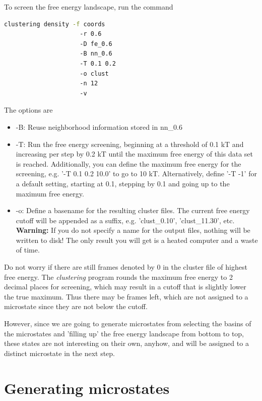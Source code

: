 \documentclass[12pt,a4paper,twoside,english,fleqn]{article}
\begin{document}
To screen the free energy landscape, run the command
\begin{lstlisting}[language=bash,basicstyle=\ttfamily]
  clustering density -f coords
                     -r 0.6
                     -D fe_0.6
                     -B nn_0.6
                     -T 0.1 0.2
                     -o clust
                     -n 12
                     -v
\end{lstlisting}
The options are
\begin{itemize}
  \item -B: Reuse neighborhood information stored in nn\_0.6
  \item -T: Run the free energy screening, beginning at a threshold of 0.1 kT
            and increasing per step by 0.2 kT until the maximum free energy
            of this data set is reached.
            Additionally, you can define the maximum free energy for the
            screening, e.g. '-T 0.1 0.2 10.0' to go to 10 kT.
            Alternatively, define '-T -1' for a default setting, starting at
            0.1, stepping by 0.1 and going up to the maximum free energy.
  \item -o: Define a basename for the resulting cluster files. The current free
            energy cutoff will be appended as a suffix, e.g. 'clust\_0.10',
            'clust\_11.30', etc. \textbf{Warning:} If you do not specify a name
            for the output files, nothing will be written to disk! The only
            result you will get is a heated computer and a waste of time.
\end{itemize}

Do not worry if there are still frames denoted by 0 in the cluster file of
highest free energy. The \emph{clustering} program rounds the maximum free
energy to 2 decimal places for screening, which may result in a cutoff that is
slightly lower the true maximum. Thus there may be frames left, which are not
assigned to a microstate since they are not below the cutoff.

However, since we are going to generate microstates from selecting the basins
of the microstates and 'filling up' the free energy landscape from bottom to
top, these states are not interesting on their own, anyhow, and will be
assigned to a distinct microstate in the next step.


\section{Generating microstates}
\end{document}
